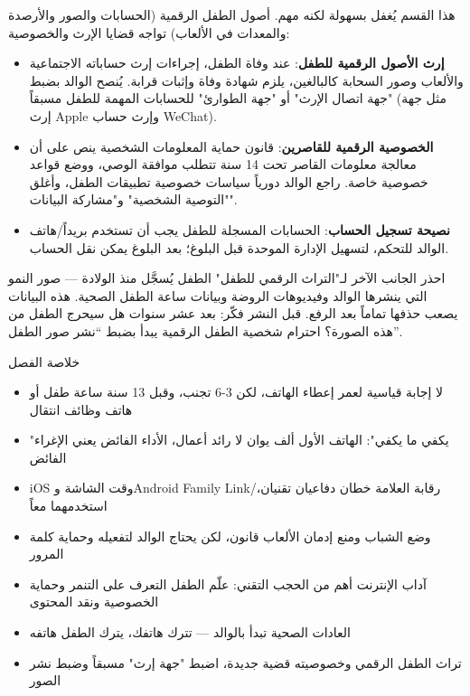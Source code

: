 
هذا القسم يُغفل بسهولة لكنه مهم. أصول الطفل الرقمية (الحسابات والصور والأرصدة والمعدات في الألعاب) تواجه قضايا الإرث والخصوصية:

\begin{itemize}
  \item \textbf{إرث الأصول الرقمية للطفل}: عند وفاة الطفل، إجراءات إرث حساباته الاجتماعية والألعاب وصور السحابة كالبالغين، يلزم شهادة وفاة وإثبات قرابة. يُنصح الوالد بضبط "جهة اتصال الإرث" أو "جهة الطوارئ" للحسابات المهمة للطفل مسبقاً (مثل جهة إرث Apple وإرث حساب WeChat).
  \item \textbf{الخصوصية الرقمية للقاصرين}: قانون حماية المعلومات الشخصية ينص على أن معالجة معلومات القاصر تحت 14 سنة تتطلب موافقة الوصي، ووضع قواعد خصوصية خاصة. راجع الوالد دورياً سياسات خصوصية تطبيقات الطفل، وأغلق "التوصية الشخصية" و"مشاركة البيانات".
  \item \textbf{نصيحة تسجيل الحساب}: الحسابات المسجلة للطفل يجب أن تستخدم بريداً/هاتف الوالد للتحكم، لتسهيل الإدارة الموحدة قبل البلوغ؛ بعد البلوغ يمكن نقل الحساب.
\end{itemize}

\begin{tcbwarn}{احذر الجانب الآخر لـ"التراث الرقمي للطفل"}
الطفل يُسجَّل منذ الولادة — صور النمو التي ينشرها الوالد وفيديوهات الروضة وبيانات ساعة الطفل الصحية. هذه البيانات يصعب حذفها تماماً بعد الرفع. قبل النشر فكّر: بعد عشر سنوات هل سيحرج الطفل من هذه الصورة؟ احترام شخصية الطفل الرقمية يبدأ بضبط “نشر صور الطفل”.

\end{tcbwarn}

\begin{tcbsummary}{خلاصة الفصل}
\begin{itemize}
  \item لا إجابة قياسية لعمر إعطاء الهاتف، لكن 3-6 تجنب، وقبل 13 سنة ساعة طفل أو هاتف وظائف انتقال
  \item "يكفي ما يكفي": الهاتف الأول ألف يوان لا رائد أعمال، الأداء الفائض يعني الإغراء الفائض
  \item iOS وقت الشاشة وAndroid Family Link/رقابة العلامة خطان دفاعيان تقنيان، استخدمهما معاً
  \item وضع الشباب ومنع إدمان الألعاب قانون، لكن يحتاج الوالد لتفعيله وحماية كلمة المرور
  \item آداب الإنترنت أهم من الحجب التقني: علّم الطفل التعرف على التنمر وحماية الخصوصية ونقد المحتوى
  \item العادات الصحية تبدأ بالوالد — تترك هاتفك، يترك الطفل هاتفه
  \item تراث الطفل الرقمي وخصوصيته قضية جديدة، اضبط "جهة إرث" مسبقاً وضبط نشر الصور
\end{itemize}

\end{tcbsummary}
